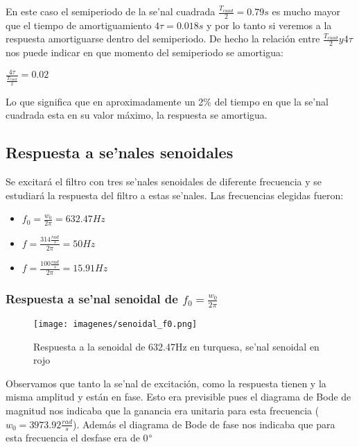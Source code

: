 \documentclass[12pt, titlepage]{article}
\begin{document}
    En este caso el semiperiodo de la se'nal cuadrada $\frac{T_{cuad}}{2} = 0.79s$ es mucho mayor que el tiempo de amortiguamiento $4\tau = 0.018s$ y por lo tanto si veremos a la respuesta amortiguarse dentro del semiperiodo. De hecho la relación entre $\frac{T_{cuad}}{2} y 4\tau$ nos puede indicar en que momento del semiperiodo se amortigua:
    
    \begin{center}
        $\frac{4\tau}{\frac{T_{cuad}}{2}} = 0.02$
    \end{center}
    
    Lo que significa que en aproximadamente un 2\% del tiempo en que la se'nal cuadrada esta en su valor máximo, la respuesta se amortigua. 

    \subsection{Respuesta a se'nales senoidales}
    Se excitará el filtro con tres se'nales senoidales de diferente frecuencia y se estudiará la respuesta del filtro a estas se'nales.
    Las frecuencias elegidas fueron: 
    \begin{itemize}
        \item $f_0 = \frac{w_0}{2\pi} = 632.47Hz$
        \item $f = \frac{314\frac{rad}{s}}{2\pi} = 50Hz$
        \item $f = \frac{100\frac{rad}{s}}{2\pi} = 15.91Hz$
    \end{itemize}

    \subsubsection{Respuesta a se'nal senoidal de $f_0 = \frac{w_0}{2\pi}$}
    
     \begin{figure}[!htb]
     \texttt{[image: imagenes/senoidal\_f0.png]}
     \centering
     \caption{Respuesta a la senoidal de 632.47Hz en turquesa, se'nal senoidal en rojo}
    \end{figure}
    
    Observamos que tanto la se'nal de excitación, como la respuesta tienen y la misma amplitud y están en fase. Esto era previsible pues el diagrama de Bode de magnitud nos indicaba que la ganancia era unitaria para esta frecuencia ($w_0 = 3973.92\frac{rad}{s}$). Además el diagrama de Bode de fase nos indicaba que para esta frecuencia el desfase era de 0$\degree$
    
\end{document}
